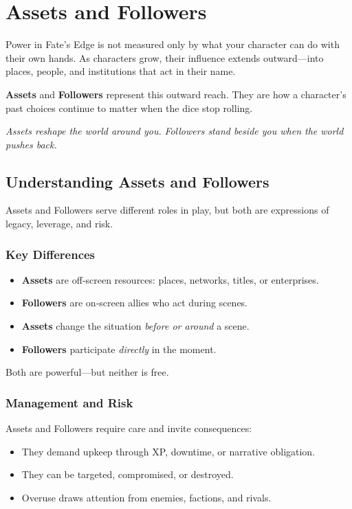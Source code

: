 \chapter{Assets and Followers}
\label{ch:assets-followers}

Power in Fate’s Edge is not measured only by what your character can do with their own hands.  
As characters grow, their influence extends outward—into places, people, and institutions that act in their name.

\textbf{Assets} and \textbf{Followers} represent this outward reach.  
They are how a character’s past choices continue to matter when the dice stop rolling.

\emph{Assets reshape the world around you.}  
\emph{Followers stand beside you when the world pushes back.}

\section{Understanding Assets and Followers}
\label{sec:assets-followers-overview}

Assets and Followers serve different roles in play, but both are expressions of legacy, leverage, and risk.

\subsection*{Key Differences}
\begin{itemize}
\item \textbf{Assets} are off‑screen resources: places, networks, titles, or enterprises.
\item \textbf{Followers} are on‑screen allies who act during scenes.
\item \textbf{Assets} change the situation \emph{before or around} a scene.
\item \textbf{Followers} participate \emph{directly} in the moment.
\end{itemize}

Both are powerful—but neither is free.

\subsection*{Management and Risk}
Assets and Followers require care and invite consequences:
\begin{itemize}
\item They demand upkeep through XP, downtime, or narrative obligation.
\item They can be targeted, compromised, or destroyed.
\item Overuse draws attention from enemies, factions, and rivals.
\end{itemize}

